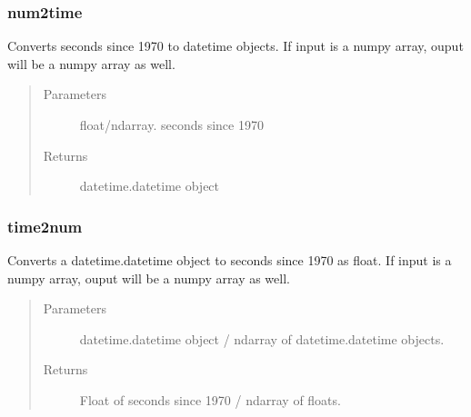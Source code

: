 \documentclass[letterpaper,10pt,english]{sphinxmanual}
\begin{document}
\subsubsection{num2time}
\label{\detokenize{generated/MPPy.tools.tools.num2time::doc}}\label{\detokenize{generated/MPPy.tools.tools.num2time:num2time}}

\begin{fulllineitems}
\label{\detokenize{generated/MPPy.tools.tools.num2time:MPPy.tools.tools.num2time}}
Converts seconds since 1970 to datetime objects.
If input is a numpy array, ouput will be a numpy array as well.
\begin{quote}\begin{description}
\item[{Parameters}] \leavevmode
{} \textendash{} float/ndarray.  seconds since 1970

\item[{Returns}] \leavevmode
datetime.datetime object

\end{description}\end{quote}

\end{fulllineitems}



\subsubsection{time2num}
\label{\detokenize{generated/MPPy.tools.tools.time2num::doc}}\label{\detokenize{generated/MPPy.tools.tools.time2num:time2num}}

\begin{fulllineitems}
\label{\detokenize{generated/MPPy.tools.tools.time2num:MPPy.tools.tools.time2num}}
Converts a datetime.datetime object to seconds since 1970 as float.
If input is a numpy array, ouput will be a numpy array as well.
\begin{quote}\begin{description}
\item[{Parameters}] \leavevmode
{} \textendash{} datetime.datetime object / ndarray of datetime.datetime objects.

\item[{Returns}] \leavevmode
Float of seconds since 1970 / ndarray of floats.

\end{description}\end{quote}

\end{fulllineitems}
\end{document}

